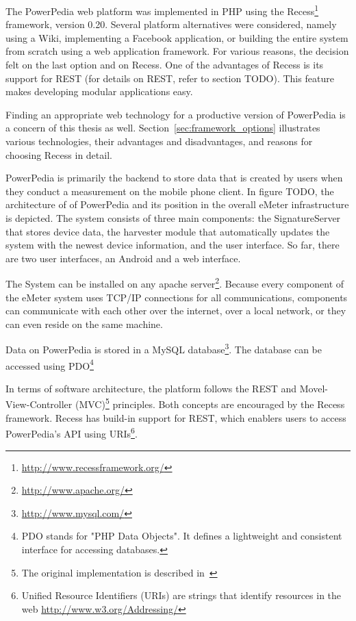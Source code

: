 The PowerPedia web platform was implemented in PHP using the Recess\footnote{\url{http://www.recessframework.org/}} framework, version 0.20. Several platform alternatives were considered, namely using a Wiki, implementing a Facebook application, or building the entire system from scratch using a web application framework. For various reasons, the decision felt on the last option and on Recess. 
One of the advantages of Recess is its support for REST (for details on REST, refer to section TODO). This feature makes developing modular applications easy.

Finding an appropriate web technology for a productive version of PowerPedia is a concern of this thesis as well. Section~\ref{sec:framework_options} illustrates various technologies, their advantages and disadvantages, and reasons for choosing Recess in detail.  
  
PowerPedia is primarily the backend to store data that is created by users when they conduct a measurement on the mobile phone client. In figure TODO, the architecture of of PowerPedia and its position in the overall eMeter infrastructure is depicted. The system consists of three main components: the SignatureServer that stores device data, the harvester module that automatically updates the system with the newest device information, and the user interface. So far, there are two user interfaces, an Android and a web interface. 

The System can be installed on any apache server\footnote{\url{http://www.apache.org/}}. Because every component of the eMeter system uses TCP/IP connections for all communications, components can communicate with each other over the internet, over a local network, or they can even reside on the same machine.

Data on PowerPedia is stored in a MySQL database\footnote{\url{http://www.mysql.com/}}. The database can be accessed using PDO\footnote{PDO stands for "PHP Data Objects". It defines a lightweight and consistent interface for accessing databases\cite{merklepp}.}

In terms of software architecture, the platform follows the REST\cite{Fielding2000} and Movel-View-Controller (MVC)\footnote{The original implementation is described in~\cite{burbeck87}} principles. Both concepts are encouraged by the Recess framework. Recess has build-in support for REST, which enablers users to access PowerPedia's API using URIs\footnote{Unified Resource Identifiers (URIs) are strings that identify resources in the web \url{http://www.w3.org/Addressing/}}\cite{weiss:inprocPUC:2012}. 
 
